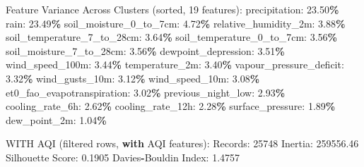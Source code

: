 \documentclass[
  letterpaper,
  DIV=11,
  numbers=noendperiod]{scrartcl}
\newenvironment{Shaded}{\begin{snugshade}}{\end{snugshade}}
\newcommand{\BuiltInTok}[1]{#1}
\newcommand{\ControlFlowTok}[1]{\textcolor[rgb]{0.13,0.29,0.53}{\textbf{#1}}}
\newcommand{\DecValTok}[1]{\textcolor[rgb]{0.00,0.00,0.81}{#1}}
\newcommand{\FloatTok}[1]{\textcolor[rgb]{0.00,0.00,0.81}{#1}}
\newcommand{\NormalTok}[1]{#1}
\newcommand{\OperatorTok}[1]{\textcolor[rgb]{0.81,0.36,0.00}{\textbf{#1}}}
\begin{document}
\begin{Shaded}
\begin{Highlighting}[]
\NormalTok{  Feature Variance Across Clusters (}\BuiltInTok{sorted}\NormalTok{, }\DecValTok{19}\NormalTok{ features):}
\NormalTok{    precipitation: }\FloatTok{23.50}\OperatorTok{\%}
\NormalTok{    rain: }\FloatTok{23.49}\OperatorTok{\%}
\NormalTok{    soil\_moisture\_0\_to\_7cm: }\FloatTok{4.72}\OperatorTok{\%}
\NormalTok{    relative\_humidity\_2m: }\FloatTok{3.88}\OperatorTok{\%}
\NormalTok{    soil\_temperature\_7\_to\_28cm: }\FloatTok{3.64}\OperatorTok{\%}
\NormalTok{    soil\_temperature\_0\_to\_7cm: }\FloatTok{3.56}\OperatorTok{\%}
\NormalTok{    soil\_moisture\_7\_to\_28cm: }\FloatTok{3.56}\OperatorTok{\%}
\NormalTok{    dewpoint\_depression: }\FloatTok{3.51}\OperatorTok{\%}
\NormalTok{    wind\_speed\_100m: }\FloatTok{3.44}\OperatorTok{\%}
\NormalTok{    temperature\_2m: }\FloatTok{3.40}\OperatorTok{\%}
\NormalTok{    vapour\_pressure\_deficit: }\FloatTok{3.32}\OperatorTok{\%}
\NormalTok{    wind\_gusts\_10m: }\FloatTok{3.12}\OperatorTok{\%}
\NormalTok{    wind\_speed\_10m: }\FloatTok{3.08}\OperatorTok{\%}
\NormalTok{    et0\_fao\_evapotranspiration: }\FloatTok{3.02}\OperatorTok{\%}
\NormalTok{    previous\_night\_low: }\FloatTok{2.93}\OperatorTok{\%}
\NormalTok{    cooling\_rate\_6h: }\FloatTok{2.62}\OperatorTok{\%}
\NormalTok{    cooling\_rate\_12h: }\FloatTok{2.28}\OperatorTok{\%}
\NormalTok{    surface\_pressure: }\FloatTok{1.89}\OperatorTok{\%}
\NormalTok{    dew\_point\_2m: }\FloatTok{1.04}\OperatorTok{\%}

\NormalTok{WITH AQI (filtered rows, }\ControlFlowTok{with}\NormalTok{ AQI features):}
\NormalTok{  Records: }\DecValTok{25748}
\NormalTok{  Inertia: }\FloatTok{259556.46}
\NormalTok{  Silhouette Score: }\FloatTok{0.1905}
\NormalTok{  Davies}\OperatorTok{{-}}\NormalTok{Bouldin Index: }\FloatTok{1.4757}


\end{Highlighting}
\end{Shaded}
\end{document}

